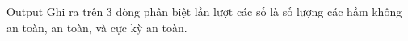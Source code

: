 Output
Ghi ra trên 3 dòng phân biệt lần lượt các số là số lượng các hầm không an toàn, an toàn, và cực kỳ an toàn.